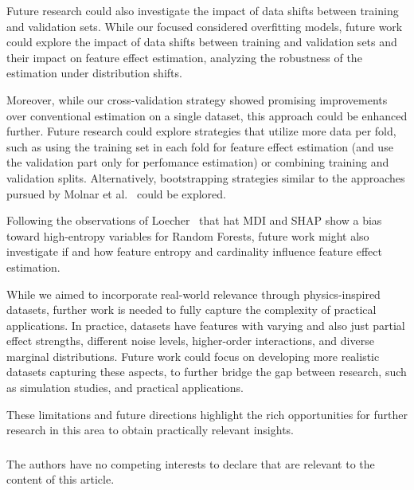 \documentclass[runningheads]{llncs}
\begin{document}
Future research could also investigate the impact of data shifts between training and validation sets.
While our focused considered overfitting models, future work could explore the impact of data shifts
between training and validation sets and their impact on feature effect estimation, analyzing the
robustness of the estimation under distribution shifts.

Moreover, while our cross-validation strategy showed promising improvements over
conventional estimation on a single dataset, this approach could be enhanced further.
Future research could explore strategies that utilize more data per fold, such as using the
training set in each fold for feature effect estimation (and use the validation part only for
perfomance estimation) or combining training and validation splits. Alternatively, bootstrapping
strategies similar to the approaches pursued by Molnar et al.~\cite{molnar_relating_2023} could be
explored.

Following the observations of Loecher~\cite{loecher_debiasing_2024} that hat MDI and SHAP show
a bias toward high-entropy variables for Random Forests, future work might also investigate if and how
feature entropy and cardinality influence feature effect estimation.

While we aimed to incorporate real-world relevance through physics-inspired datasets, further
work is needed to fully capture the complexity of practical applications. In practice, datasets
have features with varying and also just partial effect strengths, different noise levels,
higher-order interactions, and diverse marginal distributions. Future work could focus on
developing more realistic datasets capturing these aspects, to further bridge the gap between
research, such as simulation studies, and practical applications.

These limitations and future directions highlight the rich opportunities for further research
in this area to obtain practically relevant insights.

\begin{credits}
    \subsubsection{\discintname}
    The authors have no competing interests to declare that are relevant to the
    content of this article.
\end{credits}
\end{document}
